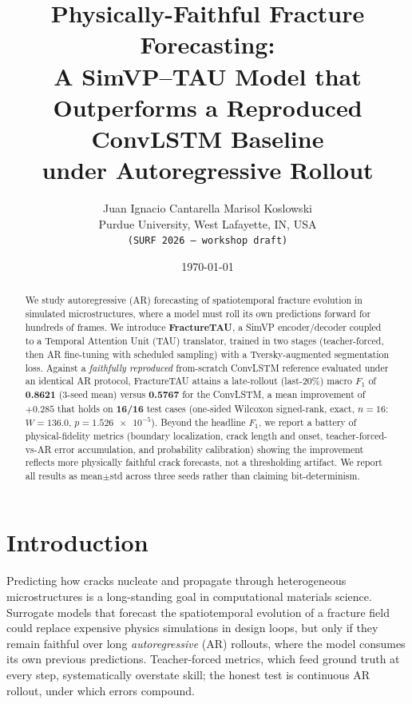 \documentclass[11pt]{article}
\title{Physically-Faithful Fracture Forecasting:\\
A SimVP--TAU Model that Outperforms a Reproduced ConvLSTM Baseline\\
under Autoregressive Rollout}
\author{Juan Ignacio Cantarella \quad Marisol Koslowski\\
Purdue University, West Lafayette, IN, USA\\
\texttt{(SURF 2026 --- workshop draft)}}
\date{\today}
\begin{document}
\maketitle

\begin{abstract}
We study autoregressive (AR) forecasting of spatiotemporal fracture evolution in
simulated microstructures, where a model must roll its own predictions forward
for hundreds of frames. We introduce \textbf{FractureTAU}, a SimVP
encoder/decoder coupled to a Temporal Attention Unit (TAU) translator, trained
in two stages (teacher-forced, then AR fine-tuning with scheduled sampling) with
a Tversky-augmented segmentation loss. Against a \emph{faithfully reproduced}
from-scratch ConvLSTM reference evaluated under an identical AR protocol,
FractureTAU attains a late-rollout (last-20\%) macro $F_1$ of
\textbf{0.8621} (3-seed mean) versus \textbf{0.5767} for the ConvLSTM, a mean
improvement of $+0.285$ that holds on \textbf{16/16} test cases (one-sided
Wilcoxon signed-rank, exact, $n{=}16$: $W{=}136.0$, $p{=}\num{1.526e-5}$).
Beyond the headline $F_1$, we report a battery of physical-fidelity metrics
(boundary localization, crack length and onset, teacher-forced-vs-AR error
accumulation, and probability calibration) showing the improvement reflects more
physically faithful crack forecasts, not a thresholding artifact. We report all
results as mean$\pm$std across three seeds rather than claiming bit-determinism.
\end{abstract}

\section{Introduction}
\label{sec:intro}

Predicting how cracks nucleate and propagate through heterogeneous
microstructures is a long-standing goal in computational materials science.
Surrogate models that forecast the spatiotemporal evolution of a fracture field
could replace expensive physics simulations in design loops, but only if they
remain faithful over long \emph{autoregressive} (AR) rollouts, where the model
consumes its own previous predictions. Teacher-forced metrics, which feed ground
truth at every step, systematically overstate skill; the honest test is
continuous AR rollout, under which errors compound.
\end{document}
